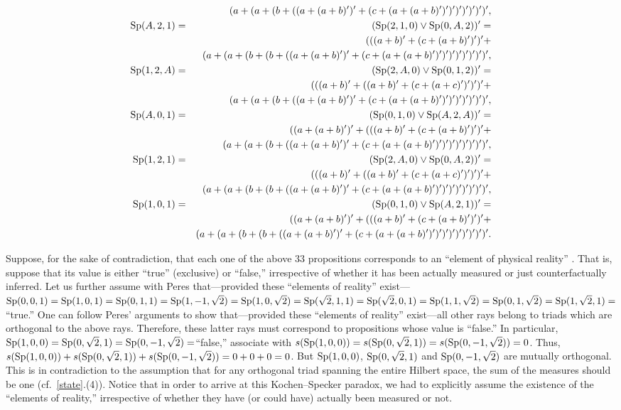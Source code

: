 {\begin {eqnarray*}
               &&(a+(a+(b+((a+(a+b)')'+(c+(a+(a+b)')')')')')')')',\\
\gen A212100A2 (((a+b)'+(c+(a+b)')')'+\\*%
               &&(a+(a+(b+(b+((a+(a+b)')'+(c+(a+(a+b)')')')')')')')')',\\
\gen 12A2A0012 (((a+b)'+((a+b)'+(c+(a+c)')')')'+\\*%
               &&(a+(a+(b+((a+(a+b)')'+(c+(a+(a+b)')')')')')')')',\\
\gen A01010A2A ((a+(a+b)')'+(((a+b)'+(c+(a+b)')')'+\\*%
               &&(a+(a+(b+((a+(a+b)')'+(c+(a+(a+b)')')')')')')')')',\\
\gen 1212A00A2 (((a+b)'+((a+b)'+(c+(a+c)')')')'+\\*%
               &&(a+(a+(b+(b+((a+(a+b)')'+(c+(a+(a+b)')')')')')')')')',\\
\gen 101010A21 ((a+(a+b)')'+(((a+b)'+(c+(a+b)')')'+\\*%
               &&(a+(a+(b+(b+((a+(a+b)')'+(c+(a+(a+b)')')')')')')')')')'.
\end {eqnarray*}
}

Suppose, for the sake of contradiction, that each one of the above 33
propositions corresponds to an ``element of physical reality'' \cite{epr}.
That is, suppose that its value is either ``true'' (exclusive) or ``false,''
irrespective of whether it has been actually measured or just
counterfactually inferred. Let us further assume with Peres \cite[pp.
186-190]{Peres2,peres} that---provided these ``elements of reality''
exist---$
  {\rm Sp} (0,0,1) =
  {\rm Sp} (1,0,1) =
  {\rm Sp} (0,1,1) =
  {\rm Sp} (1,-1,\sqrt{2}) =
  {\rm Sp} (1,0,\sqrt{2}) =
  {\rm Sp} (\sqrt{2},1,1) =
  {\rm Sp} (\sqrt{2},0,1) =
  {\rm Sp} (1,1,\sqrt{2}) =
  {\rm Sp} (0,1,\sqrt{2}) =
  {\rm Sp} (1,\sqrt{2},1) =$
``true.''
One can follow Peres' arguments to show that---provided these ``elements of
reality'' exist---all  other rays belong to triads which are orthogonal to
the above rays. Therefore, these latter rays must correspond to propositions
whose value is ``false.'' In particular, ${\rm Sp} (1,0,0)={\rm Sp} (0,\sqrt{2},1)={\rm Sp}
(0,-1,\sqrt{2})=$``false,'' associate with $s({\rm Sp} (1,0,0))=s({\rm Sp}
(0,\sqrt{2},1))=s({\rm Sp} (0,-1,\sqrt{2}))=0$. Thus, $s({\rm Sp} (1,0,0))+s({\rm Sp}
(0,\sqrt{2},1))+s({\rm Sp} (0,-1,\sqrt{2})) =0+0+0=0$. But ${\rm Sp} (1,0,0)$, ${\rm Sp}
(0,\sqrt{2},1)$ and ${\rm Sp} (0,-1,\sqrt{2})$ are mutually orthogonal. This is
in contradiction to the assumption that for any orthogonal triad spanning
the entire Hilbert space, the sum of the measures should be one (cf.\
\ref{state}.(4)). Notice that in order to arrive at this Kochen--Specker
paradox, we had to explicitly assume the existence of the ``elements of
reality,'' irrespective of whether they have (or could have) actually been
measured or not.

